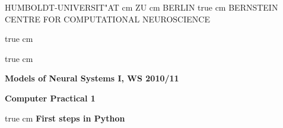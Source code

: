 \documentclass[12pt]{article}
\begin{document}
\parbox{2cm}{
}
\parbox{11cm}{
\begin{center}
\large HUMBOLDT-UNIVERSIT"AT  cm ZU  cm BERLIN
 true cm
\mgross BERNSTEIN CENTRE FOR COMPUTATIONAL NEUROSCIENCE
\end{center}
}
\parbox{2cm}
{
\hfill
{}
}

 true cm





 true cm
\centerline{\bf Models of Neural Systems I, WS 2010/11}
\centerline{\bf Computer Practical 1}


 true cm
{\bf First steps in Python}
\end{document}

